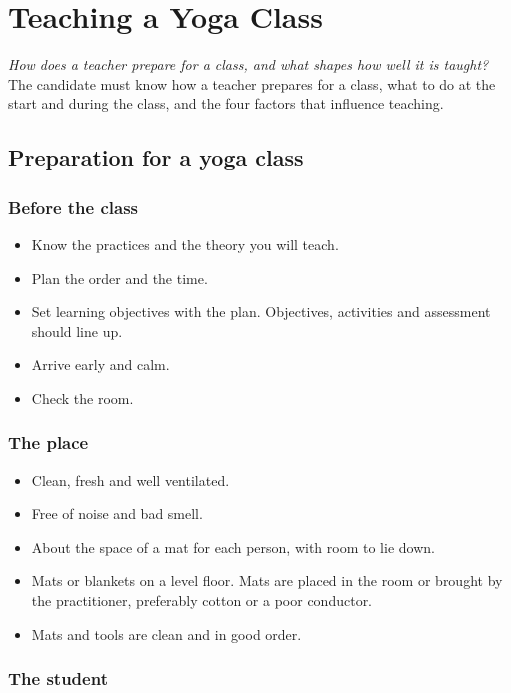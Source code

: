\chapter{Teaching a Yoga Class}\label{ch:teaching-class}

\emph{How does a teacher prepare for a class, and what shapes how well it is taught?}
The candidate must know how a teacher prepares for a class, what to do at the start and during the class, and the four factors that influence teaching.

\section{Preparation for a yoga class}


\subsection*{Before the class}

\begin{itemize}
\item Know the practices and the theory you will teach.
\item Plan the order and the time.
\item Set learning objectives with the plan. Objectives, activities and assessment should line up.
\item Arrive early and calm.
\item Check the room.
\end{itemize}

\subsection*{The place}

\begin{itemize}
\item Clean, fresh and well ventilated.
\item Free of noise and bad smell.
\item About the space of a mat for each person, with room to lie down.
\item Mats or blankets on a level floor. Mats are placed in the room or brought by the practitioner, preferably cotton or a poor conductor.
\item Mats and tools are clean and in good order.
\end{itemize}

\subsection*{The student}

